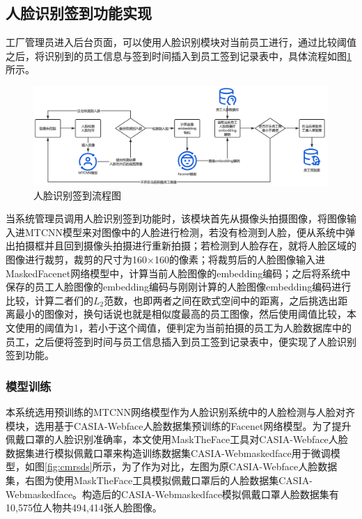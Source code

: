 \subsection{人脸识别签到功能实现}

工厂管理员进入后台页面，可以使用人脸识别模块对当前员工进行，通过比较阈值之后，将识别到的员工信息与签到时间插入到员工签到记录表中，具体流程如图\ref{fig:fcprcs}所示。

\begin{figure}[H]
    \centering
    \includegraphics[width=\textwidth]{figures/5fcprcs.png}
    \caption{人脸识别签到流程图}
    \label{fig:fcprcs}
\end{figure}

当系统管理员调用人脸识别签到功能时，该模块首先从摄像头拍摄图像，将图像输入进MTCNN模型来对图像中的人脸进行检测，若没有检测到人脸，便从系统中弹出拍摄框并且回到摄像头拍摄进行重新拍摄；若检测到人脸存在，就将人脸区域的图像进行裁剪，裁剪的尺寸为160$\times$160的像素；将裁剪后的人脸图像输入进MaskedFacenet网络模型中，计算当前人脸图像的embedding编码；之后将系统中保存的员工人脸图像的embedding编码与刚刚计算的人脸图像embedding编码进行比较，计算二者们的$L_2$范数，也即两者之间在欧式空间中的距离，之后挑选出距离最小的图像对，换句话说也就是相似度最高的员工图像，然后使用阈值比较，本文使用的阈值为1，若小于这个阈值，便判定为当前拍摄的员工为人脸数据库中的员工，之后便将签到时间与员工信息插入到员工签到记录表中，便实现了人脸识别签到功能。

\subsubsection{模型训练}

本系统选用预训练的MTCNN网络模型作为人脸识别系统中的人脸检测与人脸对齐模块，选用基于CASIA-Webface人脸数据集预训练的Facenet网络模型。为了提升佩戴口罩的人脸识别准确率，本文使用MaskTheFace工具对CASIA-Webface人脸数据集进行模拟佩戴口罩来构造训练数据集CASIA-Webmaskedface用于微调模型，如图\ref{fig:cmrsds}所示，为了作为对比，左图为原CASIA-Webface人脸数据集，右图为使用MaskTheFace工具模拟佩戴口罩后的人脸数据集CASIA-Webmaskedface。构造后的CASIA-Webmaskedface模拟佩戴口罩人脸数据集有10,575位人物共494,414张人脸图像。

